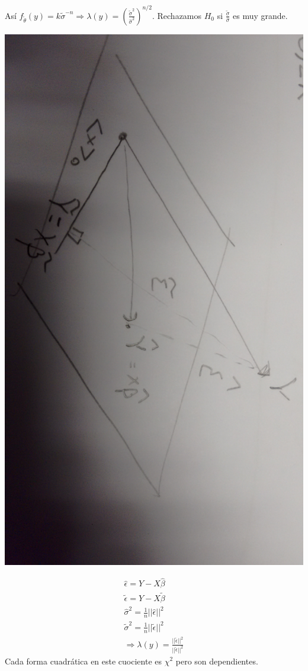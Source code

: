 \documentclass[10pt]{article}
\theoremstyle{plain}
\theoremstyle{definition}
\begin{document}
Así $f_{\tilde{\theta}} (y) = k \tilde{\sigma}^{-n} \Rightarrow \lambda(y) = \left(\frac{\tilde{\sigma}^2}{\hat{\sigma}^2}\right)^{n/2}$. Rechazamos $H_{0}$ si $\frac{\tilde{\sigma}}{\hat{\sigma}}$ es muy grande.
\begin{center}
\includegraphics[scale=0.1]{imagenes/ortogonal2.jpg}
\end{center}
\begin{align*}
\hat{\epsilon} = Y - X \hat{\beta}\\
\tilde{\epsilon} = Y - X \tilde{\beta}\\
\hat{\sigma}^2 = \frac{1}{n} ||\hat{\epsilon}||^2\\
\tilde{\sigma}^2 = \frac{1}{n} ||\tilde{\epsilon}||^2\\
\Rightarrow \lambda (y) = \frac{||\tilde{\epsilon}||^2}{||\hat{\epsilon}||^2}
\end{align*}
Cada forma cuadrática en este cuociente es $\chi^2$ pero son dependientes.\\
\end{document}
